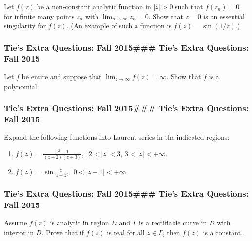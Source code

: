 Let \(f(z)\) be a non-constant analytic function in \(|z|>0\) such that
\(f(z_n) = 0\) for infinite many points \(z_n\) with
\(\lim_{n \rightarrow \infty} z_n =0\). Show that \(z=0\) is an
essential singularity for \(f(z)\). (An example of such a function is
\(f(z) = \sin (1/z)\).)

\hypertarget{ties-extra-questions-fall-2015-ties-extra-questions-fall-2015-7}{%
\subsubsection{Tie's Extra Questions: Fall 2015\#\#\# Tie's Extra
Questions: Fall
2015}\label{ties-extra-questions-fall-2015-ties-extra-questions-fall-2015-7}}

Let \(f\) be entire and suppose that
\(\lim_{z \rightarrow \infty} f(z) = \infty\). Show that \(f\) is a
polynomial.

\hypertarget{ties-extra-questions-fall-2015-ties-extra-questions-fall-2015-8}{%
\subsubsection{Tie's Extra Questions: Fall 2015\#\#\# Tie's Extra
Questions: Fall
2015}\label{ties-extra-questions-fall-2015-ties-extra-questions-fall-2015-8}}

Expand the following functions into Laurent series in the indicated
regions:

\begin{enumerate}
\def\labelenumi{(\alph{enumi})}
\item
  \(\displaystyle f(z) = \frac{z^2 - 1}{ (z+2)(z+3)}, \; \; 2 < |z| < 3\),
  \(3 < |z| < + \infty\).
\item
  \(\displaystyle f(z) = \sin \frac{z}{1-z}, \; \; 0 < |z-1| < + \infty\)
\end{enumerate}

\hypertarget{ties-extra-questions-fall-2015-ties-extra-questions-fall-2015-9}{%
\subsubsection{Tie's Extra Questions: Fall 2015\#\#\# Tie's Extra
Questions: Fall
2015}\label{ties-extra-questions-fall-2015-ties-extra-questions-fall-2015-9}}

Assume \(f(z)\) is analytic in region \(D\) and \(\Gamma\) is a
rectifiable curve in \(D\) with interior in \(D\). Prove that if
\(f(z)\) is real for all \(z \in \Gamma\), then \(f(z)\) is a constant.

